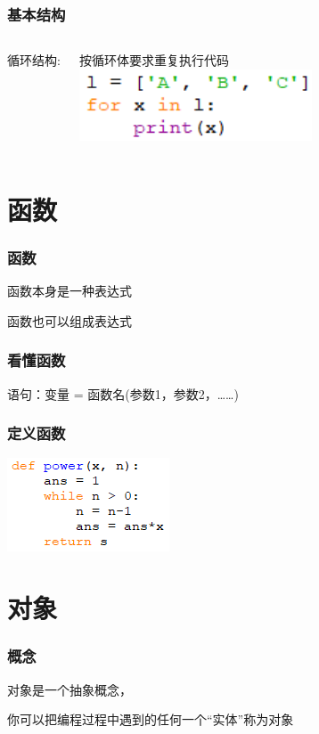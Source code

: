 \documentclass[presentation]{beamer}
\begin{document}
\begin{frame}
	\frametitle{基本结构}\centering
	\begin{columns}
    循环结构:\par
    按循环体要求重复执行代码
    \includegraphics[width=0.75\textwidth]{loop.png}
    \end{columns}
\end{frame}

\section{函数}

\begin{frame}
    \frametitle{函数}\centering
    函数本身是一种表达式\par
    函数也可以组成表达式
\end{frame}

\begin{frame}
    \frametitle{看懂函数}
    语句：变量 = 函数名(参数1，参数2，……)\par
\end{frame}

\begin{frame}
    \frametitle{定义函数}
    \includegraphics[height=0.4\textheight]{function.png}
\end{frame}

\section{对象}

\begin{frame}
    \frametitle{概念}\centering
    对象是一个抽象概念，\par
    你可以把编程过程中遇到的任何一个“实体”称为对象
\end{frame}
\end{document}
